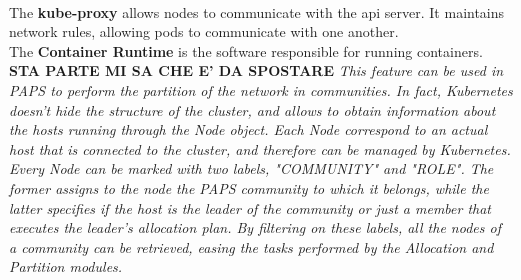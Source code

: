 \\
The \textbf{kube-proxy} allows nodes to communicate with the api server. It maintains network rules,
allowing pods to communicate with one another.
\\
The \textbf{Container Runtime} is the software responsible for running containers.
\newline
\newline
\textbf{STA PARTE MI SA CHE E' DA SPOSTARE}
\textit{This feature can be used in PAPS to perform the partition of the network in communities.
In fact, Kubernetes doesn't hide the structure of the cluster, and allows to obtain information about
the hosts running through the Node object. Each Node correspond to an actual host that is
connected to the cluster, and therefore can be managed by Kubernetes. 
Every Node can be marked with two labels, "COMMUNITY" and "ROLE". The former assigns to the node 
the PAPS community to which it belongs, while the latter specifies if the host is the leader of the
community or just a member that executes the leader's allocation plan.
By filtering on these labels, all the nodes of a community can be retrieved, easing the tasks performed 
by the Allocation and Partition modules.}